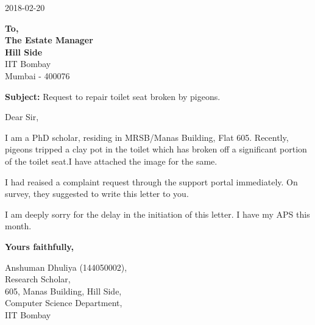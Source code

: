 \documentclass{article}
\begin{document}
\begin{center}
2018-02-20
\end{center}
\vspace{4ex}

\noindent\textbf{To,\\The Estate Manager\\Hill Side}\\IIT Bombay\\Mumbai - 400076
\vspace{4ex}

\noindent\textbf{Subject:} Request to repair toilet seat broken by pigeons.

\vspace{4ex}
\noindent{}Dear Sir,
\vspace{2ex}

\noindent{}I am a PhD scholar, residing in MRSB/Manas Building, Flat 605. Recently, pigeons tripped a clay pot in the toilet which has broken off a significant portion of the toilet seat.I have attached the image for the same.
\vspace{2ex}

\noindent{}I had reaised a complaint request through the support portal immediately. On survey, they suggested to write this letter to you.
\vspace{2ex}

\noindent{}I am deeply sorry for the delay in the initiation of this letter. I have my APS this month.
\vspace{2ex}

\vspace{8ex}
\noindent{}\textbf{Yours faithfully,}
\vspace{8ex}

\noindent{}Anshuman Dhuliya (144050002),\\
Research Scholar,\\
605, Manas Building, Hill Side,\\
Computer Science Department,\\
IIT Bombay
\end{document}
